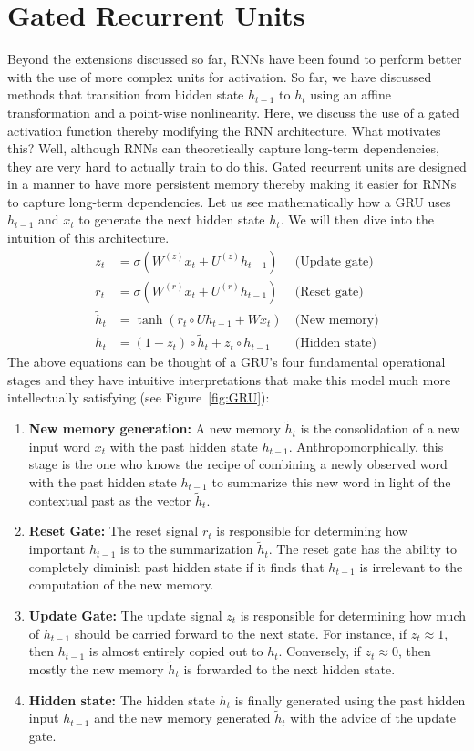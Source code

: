 \documentclass{tufte-handout}
\begin{document}
\section{Gated Recurrent Units}\label{sec:grus}
Beyond the extensions discussed so far, RNNs have been found to perform better with the use of more complex units for activation. So far, we have discussed methods that transition from hidden state $h_{t-1}$ to $h_{t}$ using an affine transformation and a point-wise nonlinearity. Here, we discuss the use of a gated activation function thereby modifying the RNN architecture. What motivates this? Well, although RNNs can theoretically capture long-term dependencies, they are very hard to actually train to do this. Gated recurrent units are designed in a manner to have more persistent memory thereby making it easier for RNNs to capture long-term dependencies. Let us see mathematically how a GRU uses $h_{t-1}$ and $x_{t}$ to generate the next hidden state $h_{t}$. We will then dive into the intuition of this architecture.
\begin{align*}
z_{t} &= \sigma(W^{(z)}x_{t} + U^{(z)}h_{t-1})&~\text{(Update gate)}\\
r_{t} &= \sigma(W^{(r)}x_{t} + U^{(r)}h_{t-1})&~\text{(Reset gate)}\\
\tilde{h}_{t} &= \operatorname{tanh}(r_{t}\circ  Uh_{t-1} + Wx_{t} )&~\text{(New memory)}\\
h_{t} &= (1 - z_{t}) \circ \tilde{h}_{t} + z_{t} \circ h_{t-1}&~\text{(Hidden state)}
\end{align*}
The above equations can be thought of a GRU's four fundamental operational stages and they have intuitive interpretations that make this model much more intellectually satisfying (see Figure~\ref{fig:GRU}):
\begin{enumerate}
\item \textbf{New memory generation:} A new memory $\tilde{h}_{t}$ is the consolidation of a new input word $x_{t}$ with the past hidden state $h_{t-1}$. Anthropomorphically, this stage is the one who knows the recipe of combining a newly observed word with the past hidden state $h_{t-1}$ to summarize this new word in light of the contextual past as the vector $\tilde{h}_{t}$.
\item \textbf{Reset Gate:} The reset signal $r_{t}$ is responsible for determining how important $h_{t-1}$ is to the summarization $\tilde{h}_{t}$. The reset gate has the ability to completely diminish past hidden state if it finds that $h_{t-1}$ is irrelevant to the computation of the new memory.
\item \textbf{Update Gate:} The update signal $z_{t}$ is responsible for determining how much of $h_{t-1}$ should be carried forward to the next state. For instance, if $z_{t} \approx 1$, then $h_{t-1}$ is almost entirely copied out to $h_{t}$. Conversely, if $z_{t} \approx 0$, then mostly the new memory $\tilde{h}_{t}$ is forwarded to the next hidden state.
\item \textbf{Hidden state:} The hidden state $h_{t}$ is finally generated using the past hidden input $h_{t-1}$ and the new memory generated $\tilde{h}_{t}$ with the advice of the update gate.
\end{enumerate}
\end{document}
